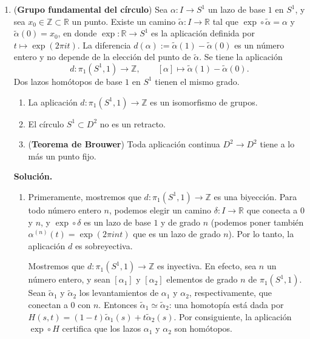 \documentclass[11pt,a4paper]{article}
\theoremstyle{plain}
\theoremstyle{definition}
\theoremstyle{remark}
\newcommand{\RR}{\mathbb R}
\newcommand{\ZZ}{\mathbb Z}
\begin{document}
\begin{enumerate}[label=\arabic*.,leftmargin=*]
\item (\textbf{Grupo fundamental del círculo}) Sea $\alpha:I\to S^1$ un lazo
de base $1$ en $S^1$, y sea $x_0\in\ZZ\subset\RR$ un punto. Existe un camino
$\tilde\alpha:I\to\RR$ tal que $\exp\circ\tilde\alpha=\alpha$ y
$\tilde\alpha(0)=x_0$, en donde $\exp:\RR\to S^1$ es la aplicación definida
por $t\mapsto\exp(2\pi it)$. La diferencia $d(\alpha):=\tilde\alpha(1)-\tilde\alpha(0)$
es un número entero y no depende de la elección del punto de $\tilde\alpha$.
Se tiene la aplicación
\[
d:\pi_1(S^1,1)\to\ZZ, \qquad [\alpha]\mapsto\tilde\alpha(1)-\tilde\alpha(0).
\]
Dos lazos homótopos de base $1$ en $S^1$ tienen el mismo grado.
\begin{enumerate}[label=\alph*)]
\item La aplicación $d:\pi_1(S^1,1)\to\ZZ$ es un isomorfismo de grupos.
\item El círculo $S^1\subset D^2$ no es un retracto.
\item (\textbf{Teorema de Brouwer}) Toda aplicación continua $D^2\to D^2$
tiene a lo más un punto fijo.
\end{enumerate}

\noindent\textbf{Solución.}
\begin{enumerate}[label=\alph*)]
\item Primeramente, mostremos que $d:\pi_1(S^1,1)\to\ZZ$ es una biyección.
Para todo número entero $n$, podemos elegir un camino $\delta:I\to\RR$ que
conecta a $0$ y $n$, y $\exp\circ\delta$ es un lazo de base $1$ y de grado
$n$ (podemos poner también $\alpha^{(n)}(t)=\exp(2\pi int)$ que es un lazo de
grado $n$). Por lo tanto, la aplicación $d$ es sobreyectiva.

Mostremos que $d:\pi_1(S^1,1)\to\ZZ$ es inyectiva. En efecto, sea $n$ un
número entero, y sean $[\alpha_1]$ y $[\alpha_2]$ elementos de grado $n$ de
$\pi_1(S^1,1)$. Sean $\tilde\alpha_1$ y $\tilde\alpha_2$ los levantamientos
de $\alpha_1$ y $\alpha_2$, respectivamente, que conectan a $0$ con $n$.
Entonces $\tilde\alpha_1\simeq\tilde\alpha_2$: una homotopía está dada por
$H(s,t)=(1-t)\tilde\alpha_1(s)+t\tilde\alpha_2(s)$. Por consiguiente, la
aplicación $\exp\circ H$ certifica que los lazos $\alpha_1$ y $\alpha_2$ son
homótopos.


\end{enumerate}
\end{enumerate}
\end{document}
